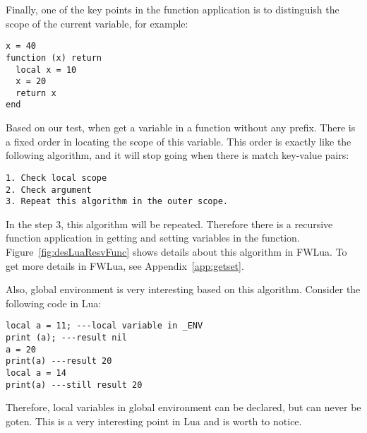 Finally, one of the key points in the function application is to distinguish the scope of the current variable, for example:

\begin{verbatim}
x = 40
function (x) return 
  local x = 10
  x = 20
  return x
end
\end{verbatim}

Based on our test, when get a variable in a function without any prefix. There is a fixed order in locating the scope of this variable. This order is exactly like the following algorithm, and it will stop going when there is match key-value pairs:

\begin{verbatim}
1. Check local scope
2. Check argument
3. Repeat this algorithm in the outer scope.
\end{verbatim}

In the step 3, this algorithm will be repeated. Therefore there is a recursive function application in getting and setting variables in the function. Figure~\ref{fig:desLuaResvFunc} shows details about this algorithm in FWLua. To get more details in FWLua, see Appendix~\ref{app:getset}.

Also, global environment is very interesting based on this algorithm. Consider the following code in Lua:

\begin{verbatim}
local a = 11; ---local variable in _ENV
print (a); ---result nil
a = 20 
print(a) ---result 20
local a = 14
print(a) ---still result 20
\end{verbatim}

Therefore, local variables in global environment can be declared, but can never be goten. This is a very interesting point in Lua and is worth to notice.

